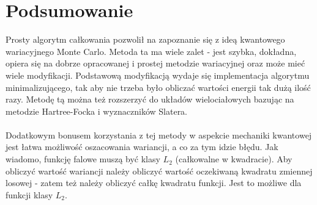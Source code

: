 \documentclass[12pt, a4paper]{article}
\begin{document}
    \section*{Podsumowanie}

    Prosty algorytm całkowania pozwolił na zapoznanie się z ideą kwantowego wariacyjnego Monte Carlo.
    Metoda ta ma wiele zalet - jest szybka, dokładna, opiera się na dobrze opracowanej i prostej metodzie wariacyjnej oraz może mieć wiele modyfikacji.
    Podstawową modyfikacją wydaje się implementacja algorytmu minimalizującego, tak aby nie trzeba było obliczać wartości energii tak dużą ilość razy.
    Metodę tą można też rozszerzyć do układów wielociałowych bazując na metodzie Hartree-Focka i wyznaczników Slatera.
    \\
    \\
    Dodatkowym bonusem korzystania z tej metody w aspekcie mechaniki kwantowej jest łatwa możliwość oszacowania wariancji, a co za tym idzie błędu.
    Jak wiadomo, funkcję falowe muszą być klasy $L_2$ (całkowalne w kwadracie).
    Aby obliczyć wartość wariancji należy obliczyć wartość oczekiwaną kwadratu zmiennej losowej - zatem też należy obliczyć całkę kwadratu funkcji.
    Jest to możliwe dla funkcji klasy $L_2$. 
\end{document}
